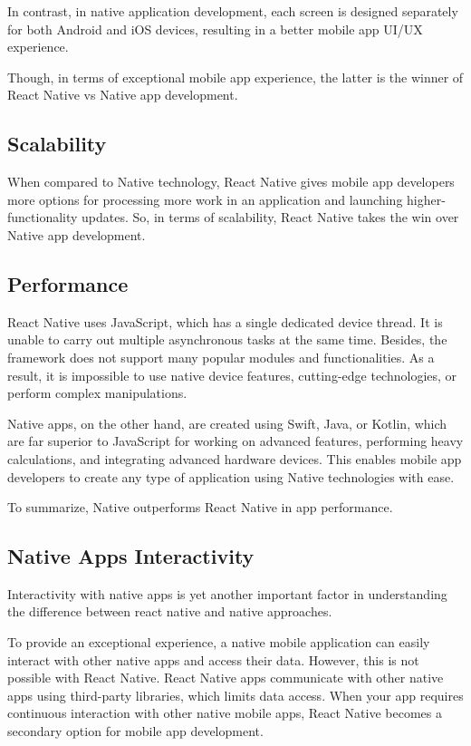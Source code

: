 In contrast, in native application development, each screen is designed separately for both Android and iOS devices,
resulting in a better mobile app UI/UX experience.

Though, in terms of exceptional mobile app experience, the latter is the winner of React Native vs Native app
development.

\subsection{Scalability}

When compared to Native technology, React Native gives mobile app developers more options for processing more work in
an application and launching higher-functionality updates.
So, in terms of scalability, React Native takes the win over Native app development.

\subsection{Performance}

React Native uses JavaScript, which has a single dedicated device thread.
It is unable to carry out multiple asynchronous tasks at the same time.
Besides, the framework does not support many popular modules and functionalities.
As a result, it is impossible to use native device features, cutting-edge technologies, or perform complex
manipulations.

Native apps, on the other hand, are created using Swift, Java, or Kotlin, which are far superior to JavaScript for
working on advanced features, performing heavy calculations, and integrating advanced hardware devices.
This enables mobile app developers to create any type of application using Native technologies with ease.

To summarize, Native outperforms React Native in app performance.

\subsection{Native Apps Interactivity}

Interactivity with native apps is yet another important factor in understanding the difference between react native
and native approaches.

To provide an exceptional experience, a native mobile application can easily interact with other native apps and
access their data.
However, this is not possible with React Native.
React Native apps communicate with other native apps using third-party libraries, which limits data access.
When your app requires continuous interaction with other native mobile apps, React Native becomes a secondary option
for mobile app development.

